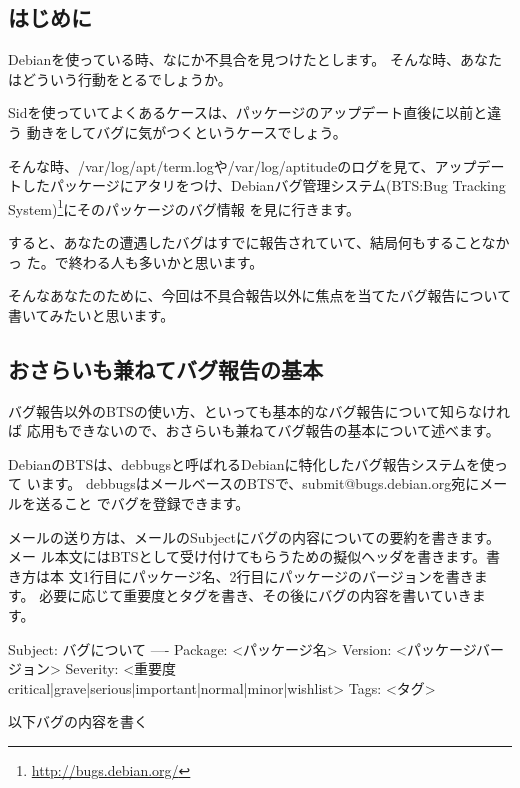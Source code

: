 \documentclass[mingoth,a4paper]{jsarticle}
\begin{document}



\subsection{はじめに}

Debianを使っている時、なにか不具合を見つけたとします。
そんな時、あなたはどういう行動をとるでしょうか。

Sidを使っていてよくあるケースは、パッケージのアップデート直後に以前と違う
動きをしてバグに気がつくというケースでしょう。

そんな時、/var/log/apt/term.logや/var/log/aptitudeのログを見て、アップデー
トしたパッケージにアタリをつけ、Debianバグ管理システム(BTS:Bug Tracking
System)\footnote{\url{http://bugs.debian.org/}}にそのパッケージのバグ情報
を見に行きます。

すると、あなたの遭遇したバグはすでに報告されていて、結局何もすることなかっ
た。で終わる人も多いかと思います。

そんなあなたのために、今回は不具合報告以外に焦点を当てたバグ報告について
書いてみたいと思います。

\subsection{おさらいも兼ねてバグ報告の基本}

バグ報告以外のBTSの使い方、といっても基本的なバグ報告について知らなければ
応用もできないので、おさらいも兼ねてバグ報告の基本について述べます。

DebianのBTSは、debbugsと呼ばれるDebianに特化したバグ報告システムを使って
います。
debbugsはメールベースのBTSで、submit@bugs.debian.org宛にメールを送ること
でバグを登録できます。

メールの送り方は、メールのSubjectにバグの内容についての要約を書きます。メー
ル本文にはBTSとして受け付けてもらうための擬似ヘッダを書きます。書き方は本
文1行目にパッケージ名、2行目にパッケージのバージョンを書きます。
必要に応じて重要度とタグを書き、その後にバグの内容を書いていきます。

\begin{commandline}
Subject: バグについて
----
Package: <パッケージ名>
Version: <パッケージバージョン>
Severity: <重要度 critical|grave|serious|important|normal|minor|wishlist>
Tags: <タグ>

以下バグの内容を書く
\end{commandline}
\end{document}
